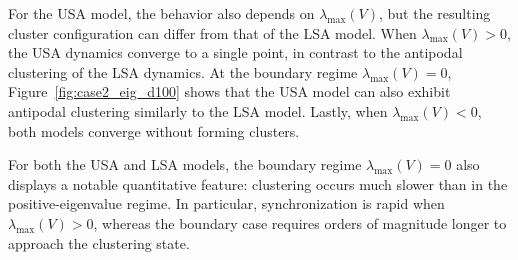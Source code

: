 \documentclass[10pt]{article}
\theoremstyle{definition}
\theoremstyle{definition}
\numberwithin{equation}{section}
\newcommand{\lambdaMax}{\lambda_{\mathrm{max}}}
\begin{document}
For the USA model, the behavior also depends on $\lambda_{\max}(V)$, but the resulting cluster configuration can differ from that of the LSA model. 
When $\lambda_{\max}(V) > 0$, the USA dynamics converge to a single point, in contrast to the antipodal clustering of the LSA dynamics.
At the boundary regime $\lambda_{\max}(V) = 0$, Figure~\ref{fig:case2_eig_d100} shows that the USA model can also exhibit antipodal clustering similarly to the LSA model.
Lastly, when $\lambdaMax(V) < 0$, both models converge without forming clusters. 


For both the USA and LSA models, the boundary regime $\lambdaMax(V) = 0$ also displays a notable quantitative feature: clustering occurs much slower than in the positive-eigenvalue regime.
In particular, synchronization is rapid when $\lambdaMax(V) > 0$, whereas the boundary case requires orders of magnitude longer to approach the clustering state.

\end{document}
